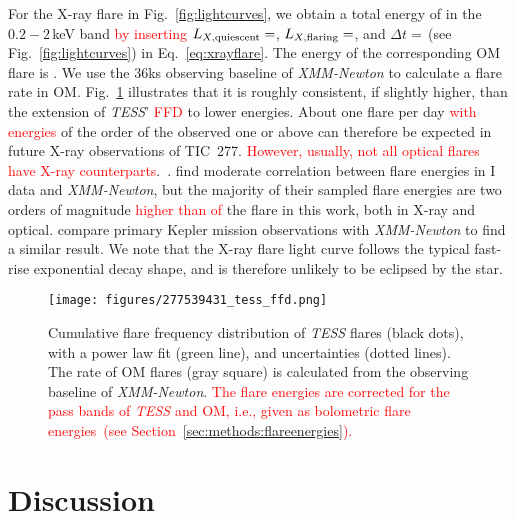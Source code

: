 \documentclass[twocolumn]{aastex631}
\begin{document}
For the X-ray flare in Fig.~\ref{fig:lightcurves}, we obtain a total energy of \eepic in the $0.2-2\,$keV band \textcolor{red}{by inserting} $L_{X,\rm quiescent}=$\LXquiet\unskip, $L_{X,\rm flaring}=$\LXflaring\unskip, and $\Delta t =$\xraydur\unskip\,(see Fig.~\ref{fig:lightcurves}) in Eq.~\ref{eq:xrayflare}. The energy of the corresponding OM flare is \eom\unskip. We use the 36ks observing baseline of \textit{XMM-Newton} to calculate a flare rate in OM. Fig.~\ref{fig:ffd} illustrates that it is roughly consistent, if slightly higher, than the extension of \textit{TESS}' \textcolor{red}{FFD} to lower energies. About one flare per day \textcolor{red}{with energies} of the order of the observed one or above can therefore be expected in future X-ray observations of TIC~277. \textcolor{red}{However, usually, not all optical flares have X-ray counterparts}.~\citet{paudel2021simultaneous}. \citet{guarcello2019simultaneous, kuznetsov2021stellar} find moderate correlation between flare energies in I data and \textit{XMM-Newton}, but the majority of their sampled flare energies are two orders of magnitude \textcolor{red}{higher than of} the flare in this work, both in X-ray and optical. \citet{kuznetsov2021stellar} compare primary Kepler mission observations with \textit{XMM-Newton} to find a similar result. We note that the X-ray flare light curve follows the typical fast-rise exponential decay shape, and is therefore unlikely to be eclipsed by the star.%


\begin{figure}
    \begin{centering}
        \texttt{[image: figures/277539431\_tess\_ffd.png]}
        \caption{
         Cumulative flare frequency distribution of \textit{TESS} flares (black dots), with a power law fit (green line), and uncertainties (dotted lines). The rate of OM flares (gray square) is calculated from the observing baseline of \textit{XMM-Newton}. \textcolor{red}{The flare energies are corrected for the pass bands of \textit{TESS} and OM, i.e., given as bolometric flare energies~(see Section~\ref{sec:methods:flareenergies}).} 
        }
        \label{fig:ffd}
    \end{centering}
\end{figure}

\section{Discussion}
\label{sec:discussion}
\end{document}
